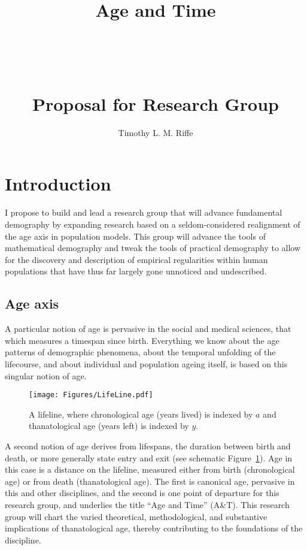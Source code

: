 \documentclass[a4paper,12pt]{article}
\begin{document}
\title{\vspace{-15mm}
\fontsize{25pt}{10pt}\selectfont
\textbf{
\hfill
\Huge{Age} \huge{and} \Huge{Time} \hfill\hfill 
} \\ ~ \\~ \\~ \\ \huge{Proposal for Research Group}}
\author{Timothy L. M. Riffe}
\maketitle

\onehalfspacing

\section{Introduction}
I propose to build and lead a research group that will advance fundamental
demography by expanding research based on a seldom-considered realignment of
the age axis in population models. This group will advance the tools of
mathematical demography and tweak the tools of practical demography to allow for
the discovery and description of empirical regularities within human populations that have thus far largely gone unnoticed and undescribed.

\subsection*{Age axis}
A particular notion of age is pervasive in the social and medical sciences, that
which measures a timespan since birth.
Everything we know about the age patterns of demographic phenomena, about the temporal
unfolding of the lifecourse, and about individual and population ageing itself,
is based on this singular notion of age. 

\begin{figure}[h]
\centering
	\caption{A lifeline, where chronological age (years lived) is indexed by $a$
	and thanatological age (years left) is indexed by $y$.}
	\label{fig:line}
	\texttt{[image: Figures/LifeLine.pdf]}	
\end{figure}

A second notion of age derives from lifespans, the duration between birth and
death, or more generally state entry and exit (see schematic
Figure~\ref{fig:line}).
Age in this case is a distance on the lifeline, measured either from birth (chronological age) or from death
(thanatological age). The first is canonical age, pervasive in this and
other disciplines, and the second is one point of departure for this research
group, and underlies the title ``Age and Time'' (A\&T). This research group
will chart the varied theoretical, methodological, and substantive
implications of thanatological age, thereby contributing to the foundations of the discipline.
\end{document}
